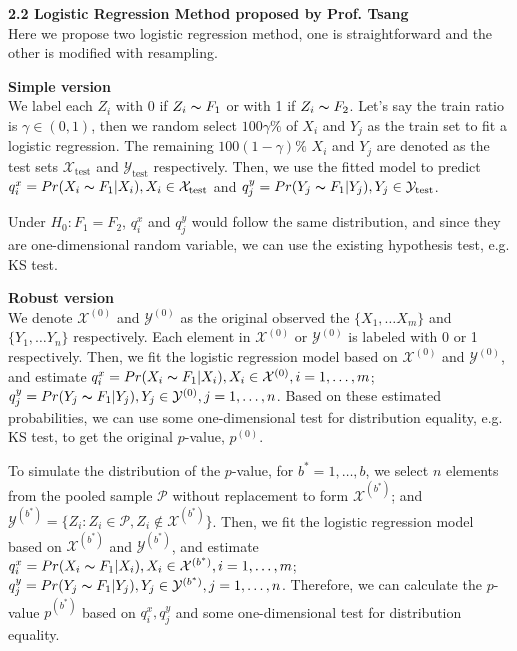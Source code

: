 \documentclass[12pt,a4paper]{article}
\begin{document}
\vspace{0.4cm}
\noindent\textbf{\large 2.2 Logistic Regression Method \small proposed by Prof. Tsang}\\
Here we propose two logistic regression method, one is straightforward and the other is modified with resampling.

\vspace{0.2cm}
\noindent\textbf{Simple version}\\
We label each $Z_i$ with 0 if $Z_i \thicksim F_1$ or with 1 if $Z_i \thicksim F_2$. Let's say the train ratio is $\gamma \in (0,1)$, then we random select $100\gamma\%$ of $X_i$ and $Y_j$ as the train set to fit a logistic regression. The remaining $100(1-\gamma)\%$ $X_i$ and $Y_j$ are denoted as the test sets $\mathcal{X}_{\text{test}}$ and $\mathcal{Y}_{\text{test}}$ respectively. Then, we use the fitted model to predict $q_i^{x} = Pr(X_i \thicksim F_1 | X_i), X_i \in \mathcal{X}_{\text{test}}$ and $q_j^{y} = Pr(Y_j \thicksim F_1 | Y_j), Y_j \in \mathcal{Y}_{\text{test}}$.

Under $H_0: F_1 = F_2$, $q_i^{x}$ and $q_j^{y}$ would follow the same distribution, and since they are one-dimensional random variable, we can use the existing hypothesis test, e.g. KS test.

\vspace{0.2cm}
\noindent\textbf{Robust version}\\
We denote $\mathcal{X}^{(0)}$ and $\mathcal{Y}^{(0)}$ as the original observed the $\{X_1, \dots X_m\}$ and $\{Y_1, \dots Y_n\}$ respectively. Each element in $\mathcal{X}^{(0)}$ or $\mathcal{Y}^{(0)}$ is labeled with 0 or 1 respectively. Then, we fit the logistic regression model based on $\mathcal{X}^{(0)}$ and $\mathcal{Y}^{(0)}$, and estimate $q_i^{x} = Pr(X_i \thicksim F_1 | X_i), X_i \in \mathcal{X}^{(0)}, i = 1, \dots, m$; $q_j^{y} = Pr(Y_j \thicksim F_1 | Y_j), Y_j \in \mathcal{Y}^{(0)}, j = 1, \dots, n$. Based on these estimated probabilities, we can use some one-dimensional test for distribution equality, e.g. KS test, to get the original $p$-value, $p^{(0)}$.

To simulate the distribution of the $p$-value, for $b^* = 1, \dots, b$, we select $n$ elements from the pooled sample $\mathcal{P}$ without replacement to form $\mathcal{X}^{(b^*)}$; and $\mathcal{Y}^{(b^*)} = \{Z_i: Z_i \in \mathcal{P}, Z_i \notin \mathcal{X}^{(b^*)}\}$. Then, we fit the logistic regression model based on $\mathcal{X}^{(b^*)}$ and $\mathcal{Y}^{(b^*)}$, and estimate $q_i^{x} = Pr(X_i \thicksim F_1 | X_i), X_i \in \mathcal{X}^{(b^*)}, i = 1, \dots, m$; $q_j^{y} = Pr(Y_j \thicksim F_1 | Y_j), Y_j \in \mathcal{Y}^{(b^*)}, j = 1, \dots, n$. Therefore, we can calculate the $p$-value $p^{(b^*)}$ based on $q_i^{x}, q_j^{y}$ and some one-dimensional test for distribution equality. 
\end{document}
